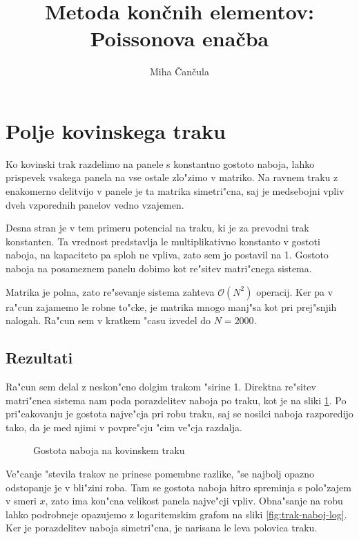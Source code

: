 \documentclass[a4paper,10pt]{article}
\title{Metoda kon\v cnih elementov: \\ Poissonova ena\v cba}
\author{Miha \v Can\v cula}
\begin{document}
\maketitle

\section{Polje kovinskega traku}

Ko kovinski trak razdelimo na panele s konstantno gostoto naboja, lahko prispevek vsakega panela na vse ostale zlo"zimo v matriko. Na ravnem traku z enakomerno delitvijo v panele je ta matrika simetri"cna, saj je medsebojni vpliv dveh vzporednih panelov vedno vzajemen. 

Desna stran je v tem primeru potencial na traku, ki je za prevodni trak konstanten. Ta vrednost predstavlja le multiplikativno konstanto v gostoti naboja, na kapaciteto pa sploh ne vpliva, zato sem jo postavil na 1. Gostoto naboja na posameznem panelu dobimo kot re"sitev matri"cnega sistema. 

Matrika je polna, zato re"sevanje sistema zahteva $\mathcal{O}(N^2)$ operacij. Ker pa v ra"cun zajamemo le robne to"cke, je matrika mnogo manj"sa kot pri prej"snjih nalogah. Ra"cun sem v kratkem "casu izvedel do $N = 2000$. 

\subsection{Rezultati}

Ra"cun sem delal z neskon"cno dolgim trakom "sirine 1. Direktna re"sitev matri"cnea sistema nam poda porazdelitev naboja po traku, kot je na sliki \ref{fig:trak-naboj}. Po pri"cakovanju je gostota najve"cja pri robu traku, saj se nosilci naboja razporedijo tako, da je med njimi v povpre"cju "cim ve"cja razdalja. 

\begin{figure}[H]

\caption{Gostota naboja na kovinskem traku}
\label{fig:trak-naboj}
\end{figure}

Ve"canje "stevila trakov ne prinese pomembne razlike, "se najbolj opazno odstopanje je v bli"zini roba. Tam se gostota naboja hitro spreminja s polo"zajem v smeri $x$, zato ima kon"cna velikost panela najve"cji vpliv. Obna"sanje na robu lahko podrobneje opazujemo z logaritemskim grafom na sliki \ref{fig:trak-naboj-log}. Ker je porazdelitev naboja simetri"cna, je narisana le leva polovica traku. 
\end{document}
